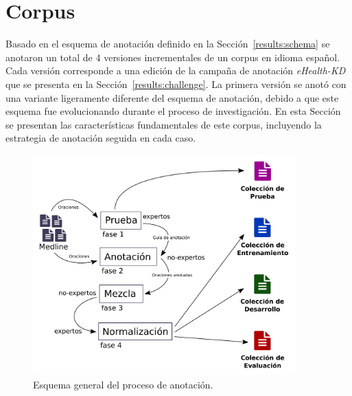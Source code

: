 \section{Corpus}\label{results:corpus}

Basado en el esquema de anotación definido en la Sección~\ref{results:schema} se anotaron un total de 4 versiones incrementales de un corpus en idioma español.
Cada versión corresponde a una edición de la campaña de anotación \textit{eHealth-KD} que se presenta en la Sección~\ref{results:challenge}. La primera versión se anotó con una variante ligeramente diferente del esquema de anotación, debido a que este esquema fue evolucionando durante el proceso de investigación.
En esta Sección se presentan las características fundamentales de este corpus, incluyendo la estrategia de anotación seguida en cada caso.

\begin{figure}[htb]
    \centering
    \includegraphics[width=0.9\textwidth]{Images/Chapters/AnnotationProcess.pdf}
    \caption{Esquema general del proceso de anotación.}
    \label{fig:annotation-process}
\end{figure}

